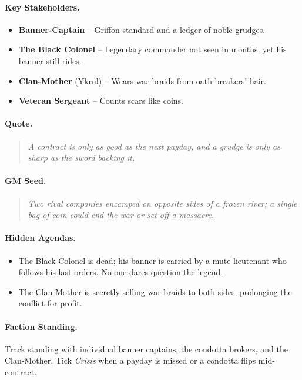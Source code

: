 \paragraph{Key Stakeholders.}
\begin{itemize}
  \item \textbf{Banner-Captain} -- Griffon standard and a ledger of noble grudges.
  \item \textbf{The Black Colonel} -- Legendary commander not seen in months, yet his banner still rides.
  \item \textbf{Clan-Mother} (Ykrul) -- Wears war-braids from oath-breakers' hair.
  \item \textbf{Veteran Sergeant} -- Counts scars like coins.
\end{itemize}

\paragraph{Quote.}
\begin{quote}
\emph{\textquotedbl A contract is only as good as the next payday, and a grudge is only as sharp as the sword backing it.\textquotedbl}
\end{quote}

\paragraph{GM Seed.}
\begin{quote}
\emph{Two rival companies encamped on opposite sides of a frozen river; a single bag of coin could end the war or set off a massacre.}
\end{quote}

\paragraph{Hidden Agendas.}
\begin{itemize}
  \item The Black Colonel is dead; his banner is carried by a mute lieutenant who follows his last orders. No one dares question the legend.
  \item The Clan-Mother is secretly selling war-braids to both sides, prolonging the conflict for profit.
\end{itemize}

\paragraph{Faction Standing.}
Track standing with individual banner captains, the condotta brokers, and the Clan-Mother. Tick \textit{Crisis} when a payday is missed or a condotta flips mid-contract.

